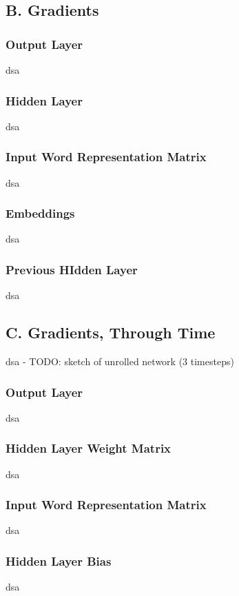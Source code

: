 \documentclass{article}
\begin{document}
\subsection*{B. Gradients}
\subsubsection*{Output Layer}
dsa

\subsubsection*{Hidden Layer}
dsa

\subsubsection*{Input Word Representation Matrix}
dsa

\subsubsection*{Embeddings}
dsa

\subsubsection*{Previous HIdden Layer}
dsa

\subsection*{C. Gradients, Through Time}
dsa - TODO: sketch of unrolled network (3 timesteps)

\subsubsection*{Output Layer}
dsa

\subsubsection*{Hidden Layer Weight Matrix}
dsa

\subsubsection*{Input Word Representation Matrix}
dsa

\subsubsection*{Hidden Layer Bias}
dsa
\end{document}
